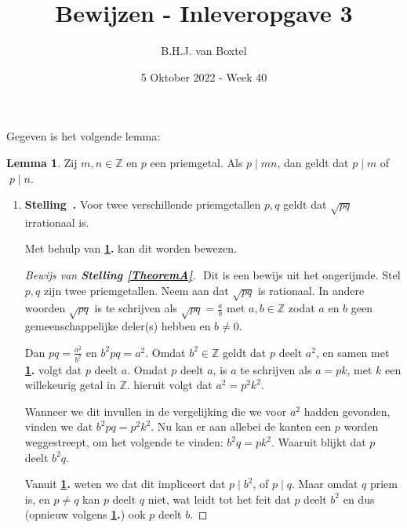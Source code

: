 \documentclass[12pt, dutch, a4paper]{article}
\theoremstyle{definition}
\newtheorem{lemmalos}{Lemma}
\newenvironment{shortthm}
  {\refstepcounter{theorem}\textbf{Stelling~\thetheorem.}}%
{\enskip}
\begin{document}
\title{Bewijzen - Inleveropgave 3}
\author{B.H.J. van Boxtel}
\date{5 Oktober 2022 - Week 40} 

\maketitle
{} 

Gegeven is het volgende lemma:
\begin{lemmalos}\label{lemma1}
    Zij $m,n \in \mathbb{Z}$ en $p$ een priemgetal. Als $p \mid mn$, 
    dan geldt dat $p \mid m$ of $\; p \mid n$.
\end{lemmalos}

\begin{enumerate}[(a.)]
    \item
    \begin{shortthm}\label{TheoremA}
        Voor twee verschillende priemgetallen $p,q$ geldt dat $\sqrt{pq}$ irrationaal is.
    \end{shortthm}
    
    Met behulp van \textbf{\cref{lemma1}.} kan dit worden bewezen.
    \begin{proof}[Bewijs van \textbf{Stelling \ref{TheoremA}}] $ $ \newline
        Dit is een bewijs uit het ongerijmde. \newline
        Stel $p,q$ zijn twee priemgetallen. \newline
        Neem aan dat $\sqrt{pq}$ is rationaal.
        In andere woorden $\sqrt{pq}$ is te schrijven als $\sqrt{pq} = \tfrac{a}{b}$ 
        met $a,b \in \mathbb{Z}$ zodat $a$ en $b$ 
        geen gemeenschappelijke deler(s) hebben en $b \neq 0$.

        Dan $pq = \tfrac{a^2}{b^2}$ en $b^2pq = a^2$. \newline
        Omdat $b^2 \in \mathbb{Z}$ geldt dat $p$ deelt $a^2$, 
        en samen met \textbf{\cref{lemma1}.} volgt dat $p$ deelt $a$. \newline 
        Omdat $p$ deelt $a$, is $a$ te schrijven als 
        $a = pk$, met $k$ een willekeurig getal in $\mathbb{Z}$.
        hieruit volgt dat $a^2 = p^2k^2$.

        Wanneer we dit invullen in de vergelijking die we voor $a^2$ hadden gevonden, 
        vinden we dat $b^2pq = p^2k^2$. 
        Nu kan er aan allebei de kanten een $p$ worden weggestreept, 
        om het volgende te vinden: $b^2q = pk^2$. Waaruit blijkt dat $p$ deelt $b^2q$.

        Vanuit \textbf{\cref{lemma1}.} weten we dat dit impliceert dat $p \mid b^2$, 
        of $p \mid q$. Maar omdat $q$ priem is, en $p \neq q$ kan $p$ deelt $q$ niet,
        wat leidt tot het feit dat $p$ deelt $b^2$ 
        en dus (opnieuw volgens \textbf{\cref{lemma1}.}) ook $p$ deelt $b$.


\end{proof}
\end{enumerate}
\end{document}
